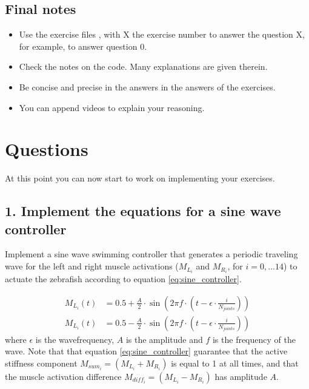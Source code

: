 \documentclass{cmc}
\begin{document}


\subsection*{Final notes}
\begin{itemize}
\item Use the exercise files , with X the exercise number to answer the question X, for example,  to answer question 0.
\item Check the notes on the code. Many explanations are given therein.
\item Be concise and precise in the answers in the answers of the exercises.
\item You can append videos to explain your reasoning.
\end{itemize}



\newpage
\section*{Questions}
At this point you can now start to work on implementing your exercises.

\subsection*{1. Implement the equations for a sine wave controller}\label{sec:ex0}
Implement a sine wave swimming controller that generates a periodic traveling wave for the left and right muscle activations ($M_{L_i}$ and $M_{R_i}$, for $i=0,...14$) to actuate the zebrafish according to equation \ref{eq:sine_controller}.

\begin{eqnarray}
  \label{eq:sine_controller}
M_{L_i} (t)&=0.5 + \frac{A}{2} \cdot \sin \left( 2 \pi f \cdot \left( t - \epsilon \cdot \frac{i}{N_{joints}} \right) \right)  \nonumber \\
M_{L_i} (t)&=0.5 - \frac{A}{2} \cdot \sin \left( 2 \pi f \cdot \left( t - \epsilon \cdot \frac{i}{N_{joints}} \right) \right)
\end{eqnarray}
where $\epsilon$ is the wavefrequency, $A$ is the amplitude and $f$ is the frequency of the wave. Note that that equation \ref{eq:sine_controller} guarantee that the active stiffness component $M_{sum_i} = (M_{L_i} + M_{R_i})$ is equal to 1 at all times, and that the muscle activation difference $M_{diff_i} = (M_{L_i} - M_{R_i})$ has amplitude $A$.
\end{document}
